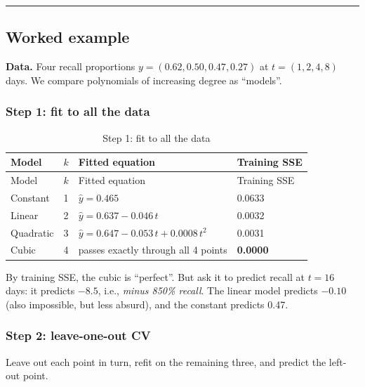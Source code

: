 \begin{center}\rule{0.5\linewidth}{0.5pt}\end{center}

\subsection{Worked example}

\textbf{Data.} Four recall proportions \(y = (0.62, 0.50, 0.47, 0.27)\)
at \(t = (1, 2, 4, 8)\) days. We compare polynomials of increasing
degree as ``models''.

\subsubsection{Step 1: fit to all the data}

\begin{longtable}[]{@{}llll@{}}
\caption{\centering Step 1: fit to all the data}\tabularnewline
\toprule\noalign{}
Model & \(k\) & Fitted equation & Training SSE \\
\midrule\noalign{}
\endfirsthead
\toprule\noalign{}
Model & \(k\) & Fitted equation & Training SSE \\
\midrule\noalign{}
\endhead
\bottomrule\noalign{}
\endlastfoot
Constant & 1 & \(\hat y = 0.465\) & 0.0633 \\
Linear & 2 & \(\hat y = 0.637 - 0.046\,t\) & 0.0032 \\
Quadratic & 3 & \(\hat y = 0.647 - 0.053\,t + 0.0008\,t^2\) & 0.0031 \\
Cubic & 4 & passes exactly through all 4 points & \textbf{0.0000} \\
\end{longtable}

By training SSE, the cubic is ``perfect''. But ask it to predict recall
at \(t = 16\) days: it predicts \(-8.5\), i.e., \emph{minus 850\%
recall}. The linear model predicts \(-0.10\) (also impossible, but less
absurd), and the constant predicts 0.47.

\subsubsection{Step 2: leave-one-out CV}

Leave out each point in turn, refit on the remaining three, and predict
the left-out point.

